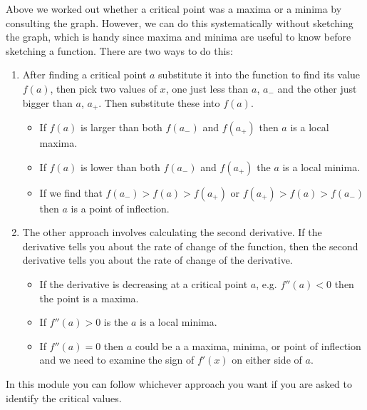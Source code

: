 Above we worked out whether a critical point was a maxima or a minima by consulting the graph. However, we can do this systematically without sketching the graph, which is handy since maxima and minima are useful to know before sketching a function. There are two ways to do this:

\begin{enumerate}
    \item After finding a critical point $a$ substitute it into the function to find its value $f(a)$, then pick two values of $x$, one just less than $a$, $a_{-}$ and the other just bigger than $a$, $a_{+}$. Then substitute these into $f(a)$.
\begin{itemize}
   	\item If $f(a)$ is larger than both $f(a_{-})$ and $f(a_{+})$ then $a$ is a local maxima.
	\item If $f(a)$ is lower than both $f(a_{-})$ and $f(a_{+})$ the $a$ is a local minima.
	\item If we find that $f(a_{-})>f(a)> f(a_{+})$ or $f(a_{+})>f(a)> f(a_{-})$ then $a$ is a point of inflection.
\end{itemize}
\item The other approach involves calculating the second derivative. If the derivative tells you about the rate of change of the function, then the second derivative tells you about the rate of change of the derivative.
\begin{itemize}
   	\item If the derivative is decreasing at a critical point $a$, e.g. $f''(a)<0$ then the point is a maxima.
	\item If $f''(a)>0$ is the $a$ is a local minima.
	\item If $f''(a)=0$ then $a$ could be a a maxima, minima, or point of inflection and we need to examine the sign of $f'(x)$ on either side of $a$.
\end{itemize} 
\end{enumerate}

In this module you can follow whichever approach you want if you are asked to identify the critical values.

